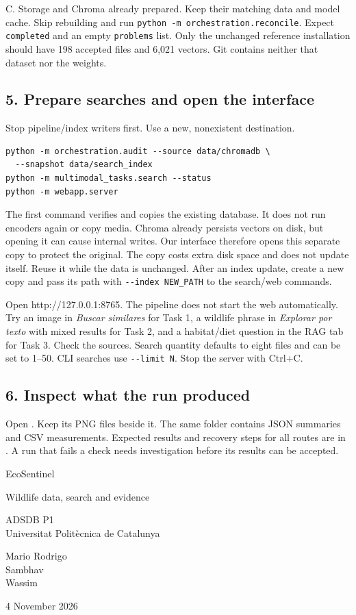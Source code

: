 \documentclass[10pt,a4paper]{article}
\begin{document}
C. Storage and Chroma already prepared. Keep their matching data and model cache. Skip rebuilding and run \texttt{python -m orchestration.reconcile}. Expect \texttt{completed} and an empty \texttt{problems} list. Only the unchanged reference installation should have 198 accepted files and 6,021 vectors. Git contains neither that dataset nor the weights.

\subsection*{5. Prepare searches and open the interface}
Stop pipeline/index writers first. Use a new, nonexistent destination.
\begin{Verbatim}
python -m orchestration.audit --source data/chromadb \
  --snapshot data/search_index
python -m multimodal_tasks.search --status
python -m webapp.server
\end{Verbatim}
The first command verifies and copies the existing database. It does not run encoders again or copy media. Chroma already persists vectors on disk, but opening it can cause internal writes. Our interface therefore opens this separate copy to protect the original. The copy costs extra disk space and does not update itself. Reuse it while the data is unchanged. After an index update, create a new copy and pass its path with \texttt{-{}-index NEW\_PATH} to the search/web commands.

Open http://127.0.0.1:8765. The pipeline does not start the web automatically. Try an image in \emph{Buscar similares} for Task 1, a wildlife phrase in \emph{Explorar por texto} with mixed results for Task 2, and a habitat/diet question in the RAG tab for Task 3. Check the sources. Search quantity defaults to eight files and can be set to 1--50. CLI searches use \texttt{-{}-limit N}. Stop the server with Ctrl+C.

\subsection*{6. Inspect what the run produced}
Open . Keep its PNG files beside it. The same folder contains JSON summaries and CSV measurements. Expected results and recovery steps for all routes are in . A run that fails a check needs investigation before its results can be accepted.

\clearpage\thispagestyle{empty}
\vspace*{22mm}
{\color{forest}\fontsize{40}{44}\selectfont\mdseries EcoSentinel\par}
\vspace{7mm}
{\LARGE Wildlife data, search and evidence\par}
\vspace{15mm}
{\large ADSDB P1\\Universitat Polit\`ecnica de Catalunya\par}
\vspace{13mm}
{\Large Mario Rodrigo\\Sambhav\\Wassim\par}
\vspace{8mm}4 November 2026
\vspace{16mm}
\end{document}
